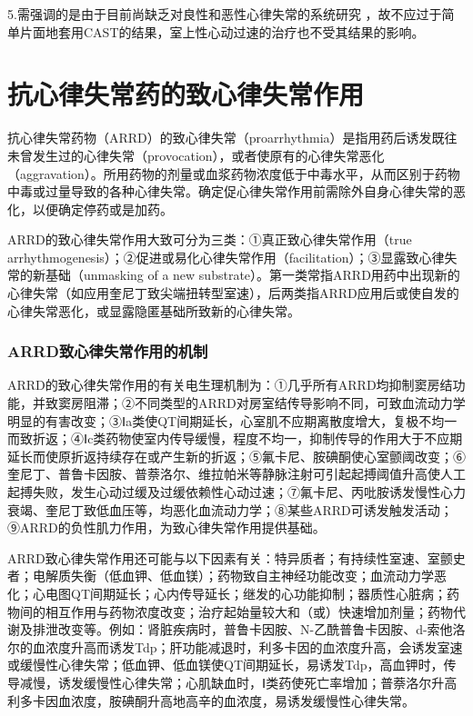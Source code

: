 5.需强调的是由于目前尚缺乏对良性和恶性心律失常的系统研究
，故不应过于简单片面地套用CAST的结果，室上性心动过速的治疗也不受其结果的影响。

\protect\hypertarget{text00423.html}{}{}

\section{抗心律失常药的致心律失常作用}

抗心律失常药物（ARRD）的致心律失常（proarrhythmia）是指用药后诱发既往未曾发生过的心律失常（provocation），或者使原有的心律失常恶化（aggravation）。所用药物的剂量或血浆药物浓度低于中毒水平，从而区别于药物中毒或过量导致的各种心律失常。确定促心律失常作用前需除外自身心律失常的恶化，以便确定停药或是加药。

ARRD的致心律失常作用大致可分为三类：①真正致心律失常作用（true
arrhythmogenesis）；②促进或易化心律失常作用（facilitation）；③显露致心律失常的新基础（unmasking
of a new
substrate）。第一类常指ARRD用药中出现新的心律失常（如应用奎尼丁致尖端扭转型室速），后两类指ARRD应用后或使自发的心律失常恶化，或显露隐匿基础所致新的心律失常。

\subsubsection{ARRD致心律失常作用的机制}

ARRD的致心律失常作用的有关电生理机制为：①几乎所有ARRD均抑制窦房结功能，并致窦房阻滞；②不同类型的ARRD对房室结传导影响不同，可致血流动力学明显的有害改变；③Ⅰa类使QT间期延长，心室肌不应期离散度增大，复极不均一而致折返；④Ⅰc类药物使室内传导缓慢，程度不均一，抑制传导的作用大于不应期延长而使原折返持续存在或产生新的折返；⑤氟卡尼、胺碘酮使心室颤阈改变；⑥奎尼丁、普鲁卡因胺、普萘洛尔、维拉帕米等静脉注射可引起起搏阈值升高使人工起搏失败，发生心动过缓及过缓依赖性心动过速；⑦氟卡尼、丙吡胺诱发慢性心力衰竭、奎尼丁致低血压等，均恶化血流动力学；⑧某些ARRD可诱发触发活动；⑨ARRD的负性肌力作用，为致心律失常作用提供基础。

ARRD致心律失常作用还可能与以下因素有关：特异质者；有持续性室速、室颤史者；电解质失衡（低血钾、低血镁）；药物致自主神经功能改变；血流动力学恶化；心电图QT间期延长；心内传导延长；继发的心功能抑制；器质性心脏病；药物间的相互作用与药物浓度改变；治疗起始量较大和（或）快速增加剂量；药物代谢及排泄改变等。例如：肾脏疾病时，普鲁卡因胺、N-乙酰普鲁卡因胺、d-索他洛尔的血浓度升高而诱发Tdp；肝功能减退时，利多卡因的血浓度升高，会诱发室速或缓慢性心律失常；低血钾、低血镁使QT间期延长，易诱发Tdp，高血钾时，传导减慢，诱发缓慢性心律失常；心肌缺血时，Ⅰ类药使死亡率增加；普萘洛尔升高利多卡因血浓度，胺碘酮升高地高辛的血浓度，易诱发缓慢性心律失常。

